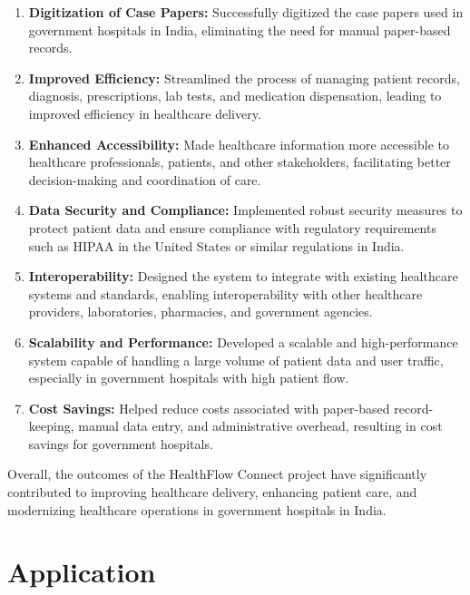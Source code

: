 \begin{enumerate}[label=\textbf{\arabic*.}]
  \item \textbf{Digitization of Case Papers:} Successfully digitized the case papers used in government hospitals in India, eliminating the need for manual paper-based records.
  
  \item \textbf{Improved Efficiency:} Streamlined the process of managing patient records, diagnosis, prescriptions, lab tests, and medication dispensation, leading to improved efficiency in healthcare delivery.
  
  \item \textbf{Enhanced Accessibility:} Made healthcare information more accessible to healthcare professionals, patients, and other stakeholders, facilitating better decision-making and coordination of care.
  
  \item \textbf{Data Security and Compliance:} Implemented robust security measures to protect patient data and ensure compliance with regulatory requirements such as HIPAA in the United States or similar regulations in India.
  
  \item \textbf{Interoperability:} Designed the system to integrate with existing healthcare systems and standards, enabling interoperability with other healthcare providers, laboratories, pharmacies, and government agencies.
  
  \item \textbf{Scalability and Performance:} Developed a scalable and high-performance system capable of handling a large volume of patient data and user traffic, especially in government hospitals with high patient flow.
  
  \item \textbf{Cost Savings:} Helped reduce costs associated with paper-based record-keeping, manual data entry, and administrative overhead, resulting in cost savings for government hospitals.
\end{enumerate}

Overall, the outcomes of the HealthFlow Connect project have significantly contributed to improving healthcare delivery, enhancing patient care, and modernizing healthcare operations in government hospitals in India.

\section{Application}

